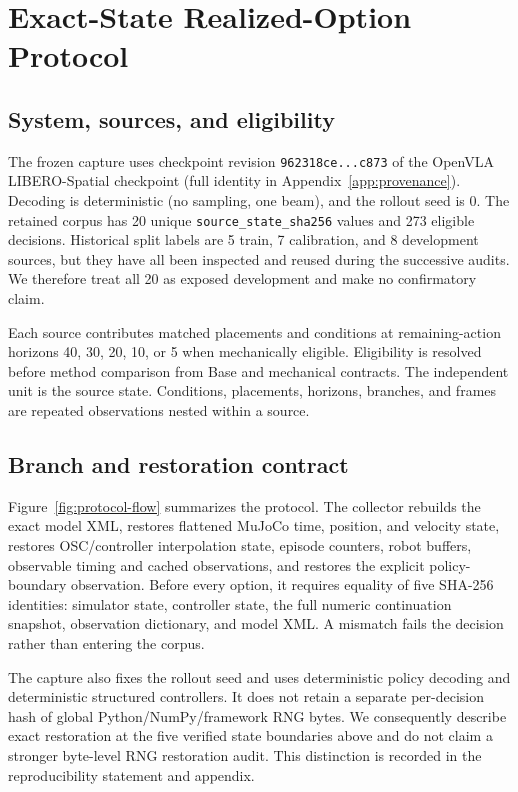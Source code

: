 \documentclass[10pt]{article}
\newcommand{\source}{\texttt{source\_state\_sha256}\xspace}
\begin{document}
\section{Exact-State Realized-Option Protocol}
\label{sec:protocol}

\subsection{System, sources, and eligibility}

The frozen capture uses checkpoint revision \texttt{962318ce...c873} of the
OpenVLA LIBERO-Spatial checkpoint (full identity in
Appendix~\ref{app:provenance}). Decoding is deterministic
(no sampling, one beam), and the rollout seed is 0. The retained corpus has 20
unique \source values and 273 eligible decisions. Historical split labels are
5 train, 7 calibration, and 8 development sources, but they have all been
inspected and reused during the successive audits. We therefore treat all 20
as exposed development and make no confirmatory claim.

Each source contributes matched placements and conditions at remaining-action
horizons 40, 30, 20, 10, or 5 when mechanically eligible. Eligibility is
resolved before method comparison from Base and mechanical contracts. The
independent unit is the source state. Conditions, placements, horizons,
branches, and frames are repeated observations nested within a source.

\subsection{Branch and restoration contract}

Figure~\ref{fig:protocol-flow} summarizes the protocol. The collector rebuilds
the exact model XML, restores flattened MuJoCo time, position, and velocity
state, restores OSC/controller interpolation state, episode counters, robot
buffers, observable timing and cached observations, and restores the explicit
policy-boundary observation. Before every option, it requires equality of five
SHA-256 identities: simulator state, controller state, the full numeric
continuation snapshot, observation dictionary, and model XML. A mismatch
fails the decision rather than entering the corpus.

The capture also fixes the rollout seed and uses deterministic policy decoding
and deterministic structured controllers. It does not retain a separate
per-decision hash of global Python/NumPy/framework RNG bytes. We consequently
describe exact restoration at the five verified state boundaries above and do
not claim a stronger byte-level RNG restoration audit. This distinction is
recorded in the reproducibility statement and appendix.
\end{document}
